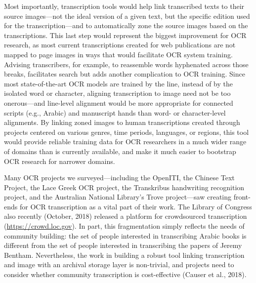\documentclass[twoside,11pt]{report}
\begin{document}
Most importantly, transcription tools would help link transcribed texts to their source images---not the ideal version of a given text, but the specific edition used for the transcription---and to automatically zone the source images based on the transcriptions.  This last step would represent the biggest improvement for OCR research, as most current transcriptions created for web publications are not mapped to page images in ways that would facilitate OCR system training. Advising transcribers, for example, to reassemble words hyphenated across those breaks, facilitates search but adds another complication to OCR training. Since most state-of-the-art OCR models are trained by the line, instead of by the isolated word or character, aligning transcription to image need not be too onerous---and line-level alignment would be more appropriate for connected scripts (e.g., Arabic) and manuscript hands than word- or character-level alignments. By linking zoned images to human transcriptions created through projects centered on various genres, time periods, languages, or regions, this tool would provide reliable training data for OCR researchers in a much wider range of domains than is currently available, and make it much easier to bootstrap OCR research for narrower domains.

Many OCR projects we surveyed---including the OpenITI, the Chinese Text Project, the Lace Greek OCR project, the Transkribus handwriting recognition project, and the Australian National Library's Trove project---saw creating front-ends for OCR transcription as a vital part of their work. The Library of Congress also recently (October, 2018) released a platform for crowdsourced transcription (\url{https://crowd.loc.gov}). In part, this fragmentation simply reflects the needs of community building: the set of people interested in transcribing Arabic books is different from the set of people interested in transcribing the papers of Jeremy Bentham. Nevertheless, the work in building a robust tool linking transcription and image with an archival storage layer is non-trivial, and projects need to consider whether community transcription is cost-effective (Causer et al., 2018).
\end{document}
